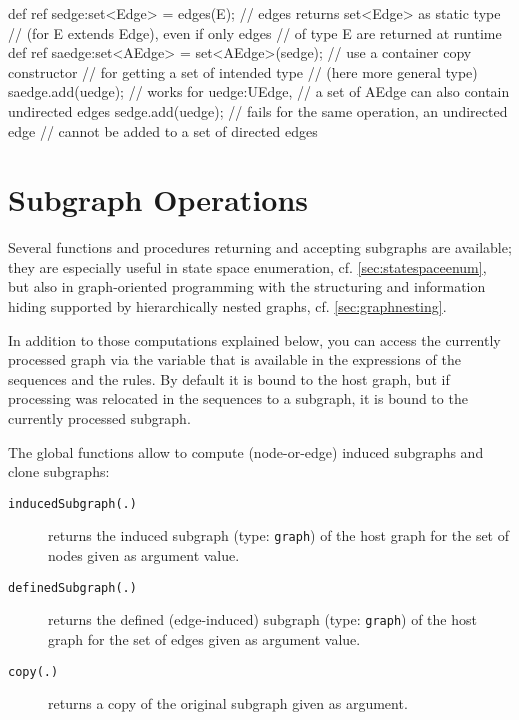 \begin{example}
\begin{grgen}
def ref sedge:set<Edge> = edges(E); // edges returns set<Edge> as static type
                                    // (for E extends Edge), even if only edges 
                                    // of type E are returned at runtime
def ref saedge:set<AEdge> = set<AEdge>(sedge); // use a container copy constructor 
                                               // for getting a set of intended type
                                               // (here more general type)
saedge.add(uedge); // works for uedge:UEdge, 
                   // a set of AEdge can also contain undirected edges
sedge.add(uedge); // fails for the same operation, an undirected edge 
                  // cannot be added to a set of directed edges
\end{grgen}
\end{example}

\section{Subgraph Operations}\label{sec:subgraphop}

Several functions and procedures returning and accepting subgraphs are available;
they are especially useful in state space enumeration, cf. \ref{sec:statespaceenum}, but also in graph-oriented programming with the structuring and information hiding supported by hierarchically nested graphs, cf. \ref{sec:graphnesting}.

In addition to those computations explained below, you can access the currently processed graph via the  \texttt{} variable that is available in the expressions of the sequences and the rules. 
By default it is bound to the host graph, but if processing was relocated in the sequences to a subgraph, it is bound to the currently processed subgraph.

The global functions allow to compute (node-or-edge) induced subgraphs and clone subgraphs:

\begin{description}
\item[\texttt{inducedSubgraph(.)}] returns the induced subgraph (type: \texttt{graph}) of the host graph for the set of nodes given as argument value.
\item[\texttt{definedSubgraph(.)}] returns the defined (edge-induced) subgraph (type: \texttt{graph}) of the host graph for the set of edges given as argument value.
\item[\texttt{copy(.)}] returns a copy of the original subgraph given as argument.
\end{description}
 
